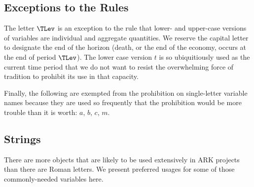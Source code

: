 \documentclass[12pt]{econtex}
\begin{document}
\subsection{Exceptions to the Rules}

The letter $\TLev$ is an exception to the rule that lower- and upper-case versions of variables are individual and aggregate quantities.  We reserve the capital letter to designate the end of the horizon (death, or the end of the economy, occurs at the end of period $\TLev$).  The lower case version $t$ is so ubiquitiously used as the current time period that we do not want to resist the overwhelming force of tradition to prohibit its use in that capacity.

Finally, the following are exempted from the prohibition on single-letter variable names because they are used so frequently that the prohibition would be more trouble than it is worth: $a$, $b$, $c$, $m$.  


\pagebreak

\subsection{Strings}

There are more objects that are likely to be used extensively in ARK projects than there are Roman letters.  We present preferred usages for some of those commonly-needed variables here.
\end{document}

